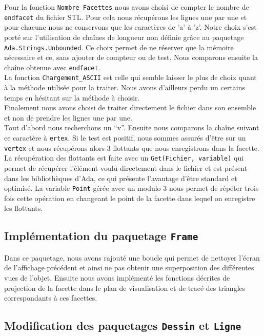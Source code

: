\documentclass[10pt]{article}
\begin{document}
Pour la fonction \lstinline!Nombre_Facettes! nous avons choisi de compter le nombre de \lstinline!endfacet! du fichier STL. Pour cela nous récupérons les lignes une par une et pour chacune nous ne conservons que les caractères de 'a' à 'z'. Notre choix s'est porté sur l'utilisation de chaînes de longueur non définie grâce au paquetage \lstinline!Ada.Strings.Unbounded!. Ce choix permet de ne réserver que la mémoire nécessaire et ce, sans ajouter de compteur ou de test. Nous comparons ensuite la chaîne obtenue avec \lstinline!endfacet!.\\
La fonction \lstinline!Chargement_ASCII! est celle qui semble laisser le plus de choix quant à la méthode utilisée pour la traiter. Nous avons d'ailleurs perdu un certains temps en hésitant sur la méthode à choisir.\\
Finalement nous avons choisi de traiter directement le fichier dans son ensemble et non de prendre les lignes une par une.\\ 
Tout d'abord nous recherchons un ``v''. Ensuite nous comparons la chaîne suivant ce caractère à \lstinline!ertex!. Si le test est positif, nous sommes assurés d'être sur un \lstinline!vertex! et nous récupérons alors 3 flottants que nous enregistrons dans la facette. La récupération des flottants est faite avec un \lstinline!Get(Fichier, variable)! qui permet de récupérer l'élément voulu directement dans le fichier et est présent dans les bibliothèques d'Ada, ce qui présente l'avantage d'être standard et optimisé.
La variable \lstinline!Point! gérée avec un modulo 3 nous permet de répéter trois fois cette opération en changeant le point de la facette dans lequel on enregistre les flottants.

\subsection{Implémentation du paquetage \lstinline!Frame!}

Dans ce paquetage, nous avons rajouté une boucle qui permet de nettoyer l'écran de l'affichage précédent et ainsi ne pas obtenir une superposition des différentes vues de l'objet.
Ensuite nous avons implémenté les fonctions décrites de projection de la facette dans le plan de visualisation et de tracé des triangles correspondants à ces facettes.

\subsection{Modification des paquetages \lstinline!Dessin! et \lstinline!Ligne!}
\end{document}
